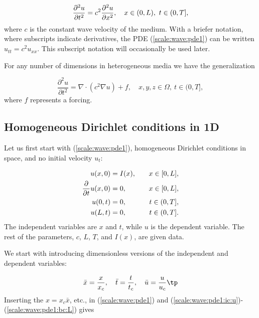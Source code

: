 \documentclass[graybox,envcountchap,sectrefs,final]{svmonodo}
\begin{document}
\begin{equation}
\frac{\partial^2 u}{\partial t^2} =
c^2 {\partial^2 u\over\partial x^2}, \quad  x\in (0,L),\ t\in (0,T],
\label{scale:wave:pde1}
\end{equation}
where $c$ is the constant wave velocity of the medium.
With a briefer notation, where subscripts indicate derivatives,
the PDE (\ref{scale:wave:pde1}) can be written
$u_{tt}=c^2u_{xx}$. This subscript notation will occasionally be
used later.

For any number of dimensions in heterogeneous media we have the generalization

\begin{equation}
\frac{\partial^2 u}{\partial t^2} =
\nabla\cdot\left(c^2 \nabla u\right) + f, \quad  x,y,z\in \Omega,\ t\in (0,T],
\label{scale:wave:pde1:3D}
\end{equation}
where $f$ represents a forcing.

\subsection{Homogeneous Dirichlet conditions in 1D}
\label{sec:scale:wave:bc_u0}

Let us first start with (\ref{scale:wave:pde1}),
homogeneous Dirichlet conditions in space, and
no initial velocity $u_t$:

\begin{align}
u(x,0) &= I(x), \quad &x\in [0,L],
\label{scale:wave:pde1:ic:u}\\ 
{\partial\over\partial t}u(x,0) &= 0, \quad & x\in [0,L],
\label{scale:wave:pde1:ic:ut}\\ 
u(0,t) & = 0, \quad  & t\in (0,T],
\label{scale:wave:pde1:bc:0}\\ 
u(L,t) & = 0, \quad  & t\in (0,T].
\label{scale:wave:pde1:bc:L}
\end{align}
The independent variables are $x$ and $t$, while $u$ is the dependent
variable.
The rest of the parameters, $c$, $L$, $T$, and $I(x)$, are given data.

We start with introducing dimensionless versions of the independent and
dependent variables:

\[
\bar x = \frac{x}{x_c},\quad \bar t=\frac{t}{t_c},\quad\bar u=\frac{u}{u_c}
\tp
\]
Inserting the $x=x_c\bar x$, etc., in (\ref{scale:wave:pde1}) and
(\ref{scale:wave:pde1:ic:u})-(\ref{scale:wave:pde1:bc:L}) gives
\end{document}
